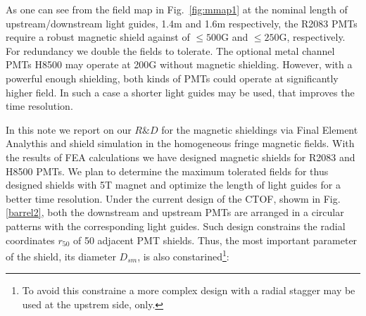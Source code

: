\documentclass[12pt]{article}
\begin{document}
As one can see from the field map in Fig.~\ref{fig:mmap1}
at the nominal length of upstream/downstream light guides, 1.4m and 1.6m respectively,
 the R2083 PMTs  require a robust magnetic shield against
of $\leq 500$G and $\leq 250$G, respectively.
 For redundancy we double the  fields to tolerate.
The   optional metal channel PMTs H8500  may operate at 200G  
without magnetic shielding.
However, with a powerful enough  shielding, both kinds of 
PMTs could operate at significantly
higher field. In such a case a  shorter light guides may  be used,
that  improves  the  time resolution.



In this note we report on our $R\&D$ for the magnetic shieldings
via Final Element Analythis and shield   simulation  in the
homogeneous fringe  magnetic fields.
With   the  results of FEA  calculations we have  designed magnetic shields 
for R2083 and H8500 PMTs.
We plan to  determine the maximum tolerated  fields for thus designed shields
 with 5T magnet and  optimize  the length of light guides for  a 
 better time resolution.
Under the current design of the CTOF, showm in Fig.\ref{barrel2},
both the downstream
and upstream PMTs are arranged in a circular patterns with the 
corresponding light guides. 
Such design constrains the 
radial coordinates $r_{50}$  of 50 adjacent PMT shields. Thus,  the most important parameter of the shield, its 
diameter $D_{sm}$,  is also constarined\footnote{ To avoid this constraine a more complex design with a  radial 
stagger may be used at the upstrem side, only.}:
\end{document}
